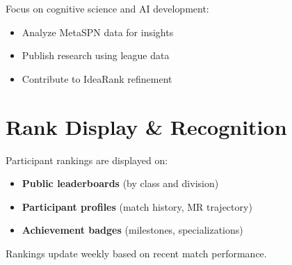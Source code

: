 Focus on cognitive science and AI development:
\begin{itemize}[leftmargin=*]
  \item Analyze MetaSPN data for insights
  \item Publish research using league data
  \item Contribute to IdeaRank refinement
\end{itemize}

\section{Rank Display \& Recognition}

Participant rankings are displayed on:
\begin{itemize}[leftmargin=*]
  \item \textbf{Public leaderboards} (by class and division)
  \item \textbf{Participant profiles} (match history, MR trajectory)
  \item \textbf{Achievement badges} (milestones, specializations)
\end{itemize}

Rankings update weekly based on recent match performance.

